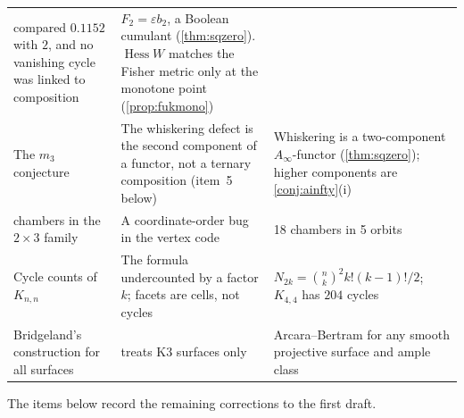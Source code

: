 \documentclass[11pt]{article}
\theoremstyle{definition}
\theoremstyle{remark}
\begin{document}
\begin{table}[ht]
\begin{tabular}{@{}R{0.2\textwidth}R{0.36\textwidth}R{0.38\textwidth}@{}}
compared $0.1152$ with $2$, and no vanishing cycle was linked to composition & $F_2=\varepsilon b_2$, a Boolean cumulant
(\cref{thm:sqzero}). $\operatorname{Hess}W$ matches the Fisher metric only at the monotone point
(\cref{prop:fukmono})\\\addlinespace[3pt]
The $m_3$ conjecture & The whiskering defect is the second component of a functor, not a ternary composition (item~5
below) & Whiskering is a two-component $A_\infty$-functor (\cref{thm:sqzero}); higher components are
\cref{conj:ainfty}(i)\\ chambers in the $2\times3$ family & A coordinate-order bug in the vertex code & 18 chambers in 5 orbits
\cite[Thm.~3.1]{Awasthi-Family}\\\addlinespace[3pt]
Cycle counts of $K_{n,n}$ & The formula undercounted by a factor $k$; facets are cells, not cycles &
$N_{2k}=\binom nk^2k!(k-1)!/2$; $K_{4,4}$ has $204$ cycles \cite[App.~A]{Awasthi-Family}\\\addlinespace[3pt]
Bridgeland's construction for all surfaces & \cite{Bridgeland2008} treats K3 surfaces only & Arcara--Bertram
\cite{ArcaraBertram2013} for any smooth projective surface and ample class\\
\bottomrule
\end{tabular}
\end{table}

The items below record the remaining corrections to the first draft.
\end{document}
